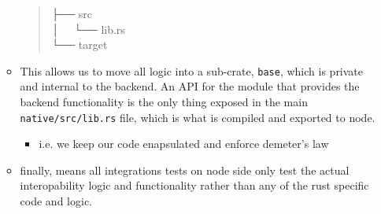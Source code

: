 \documentclass[11pt]{article}
\begin{document}
\begin{itemize}
\begin{itemize}
\begin{verse}
\hspace*{4em}├── src\\
\hspace*{4em}│   └── lib.rs\\
\hspace*{4em}└── target\\
\end{verse}
\item This allows us to move all logic into a sub-crate, \texttt{base}, which is private and internal to
the backend. An API for the module that provides the backend functionality is the only thing
exposed in the main \texttt{native/src/lib.rs} file, which is what is compiled and exported to node.
\begin{itemize}
\item i.e. we keep our code enapsulated and enforce demeter's law
\end{itemize}
\item finally, means all integrations tests on node side only test the actual interopability logic
and functionality rather than any of the rust specific code and logic.
\end{itemize}
\end{itemize}
\end{document}
